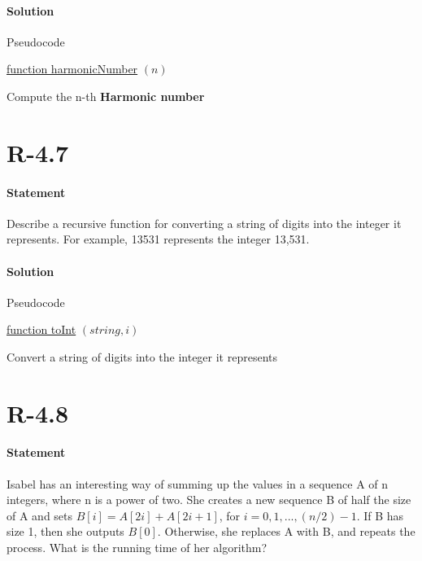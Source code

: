 \documentclass{article}
\begin{document}
  \paragraph{Solution}
    Pseudocode
    \begin{algorithm}[h!]
      
      \underline{function harmonicNumber} $(n)$\;
      \;
      \caption{Compute the n-th \textbf{Harmonic number}}
    \end{algorithm}
\section{R-4.7}
  \paragraph{Statement}
  Describe a recursive function for converting a string of digits into the integer it represents. For example, 13531 represents the integer 13,531.
  \paragraph{Solution}
    Pseudocode
    \begin{algorithm}[h!]
      
      \underline{function toInt} $(string,i)$\;
      \;
      \caption{Convert a string of digits into the integer it represents}
    \end{algorithm}
\section{R-4.8}
  \paragraph{Statement}
  Isabel has an interesting way of summing up the values in a sequence A of n integers, where n is a power of two. She creates a new sequence B of half the size of A and sets $B[i] = A[2i]+A[2i+1]$, for $i = 0,1,...,(n/2)-1$. If B has size 1, then she outputs $B[0]$. Otherwise, she replaces A with B, and repeats the process. What is the running time of her algorithm?
\end{document}
